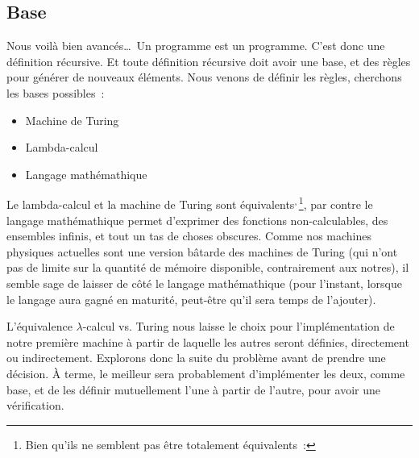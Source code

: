 \documentclass{article}
\begin{document}
\subsection{Base}

Nous voilà bien avancés\dots\ Un programme est un programme. C'est donc une définition récursive. Et toute définition récursive doit avoir une base, et des règles pour générer de nouveaux éléments. Nous venons de définir les règles, cherchons les bases possibles~:
\begin{itemize}
\item Machine de Turing
\item Lambda-calcul
\item Langage mathémathique
\end{itemize}

Le lambda-calcul et la machine de Turing sont
équivalents\cite{lambda-calculus-wikipedia}$\vphantom{X}^{,}$\footnote{Bien qu'ils ne
  semblent pas être totalement équivalents\cite{lambda-turing-equivalence}~: },
par contre le langage mathémathique permet d'exprimer des fonctions non-calculables, des ensembles infinis, et tout un tas de choses
obscures. Comme nos machines physiques actuelles sont une version bâtarde des machines de Turing (qui n'ont pas de limite sur la quantité de
mémoire disponible, contrairement aux notres), il semble sage de laisser de côté le langage mathémathique (pour l'instant, lorsque le
langage aura gagné en maturité, peut-être qu'il sera temps de l'ajouter).

L'équivalence $\lambda$-calcul vs. Turing nous laisse le choix pour l'implémentation de notre première machine à partir de laquelle les autres seront définies, directement ou indirectement. Explorons donc la suite du problème avant de prendre une décision. À terme, le meilleur sera probablement d'implémenter les deux, comme base, et de les définir mutuellement l'une à partir de l'autre, pour avoir une vérification.
\end{document}
